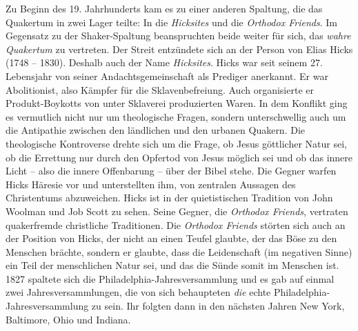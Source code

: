 Zu Beginn des 19. Jahrhunderts kam es zu einer anderen Spaltung, die das
Quakertum in zwei Lager teilte:
In die \textit{Hicksites} und die
\textit{Orthodox
Friends}. Im Gegensatz zu der Shaker-Spaltung
beanspruchten beide weiter für
sich, das \textit{wahre Quakertum} zu vertreten. Der Streit entzündete sich an
der Person von Elias Hicks (1748 -- 1830).
Deshalb
auch der Name \textit{Hicksites}.
Hicks war seit seinem 27. Lebensjahr von seiner Andachtsgemeinschaft als
Prediger
anerkannt. Er war Abolitionist, also Kämpfer
für die Sklavenbefreiung. Auch
organisierte er Produkt-Boykotts von unter Sklaverei produzierten Waren. In dem
Konflikt ging es vermutlich nicht nur um theologische Fragen, sondern
unterschwellig auch um die Antipathie zwischen den ländlichen und den urbanen
Quakern. Die theologische Kontroverse drehte sich um die Frage, ob Jesus
göttlicher Natur sei, ob die Errettung nur durch den Opfertod von Jesus möglich sei
und ob das innere Licht -- also die innere Offenbarung --
über der Bibel stehe.
Die Gegner warfen Hicks Häresie vor und unterstellten ihm, von zentralen
Aussagen des Christentums abzuweichen. Hicks ist in der quietistischen
 Tradition
von John Woolman und Job Scott zu sehen. Seine Gegner, die \textit{Orthodox
Friends}, vertraten quakerfremde christliche
Traditionen. Die
\textit{Orthodox Friends} störten sich auch an der Position von Hicks, der nicht
an einen Teufel glaubte, der das Böse zu den Menschen
brächte, sondern er
glaubte, dass die Leidenschaft (im negativen Sinne) ein Teil der menschlichen
Natur sei, und das die Sünde somit im Menschen ist. 1827 spaltete
sich die
Philadelphia-Jahresversammlung und es gab auf einmal zwei Jahresversammlungen,
die von sich behaupteten \textit{die} echte Philadelphia-Jahresversammlung zu
sein.
Ihr folgten dann in den nächsten Jahren New York,
Baltimore, Ohio und
Indiana.

\medskip

